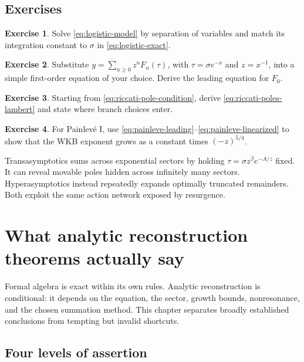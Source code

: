 \documentclass[11pt,openany]{book}
\theoremstyle{definition}
\newtheorem{exercise}{Exercise}[chapter]
\theoremstyle{plain}
\theoremstyle{remark}
\begin{document}
\section{Exercises}

\begin{exercise}
Solve \eqref{eq:logistic-model} by separation of variables and match its integration constant to $\sigma$ in \eqref{eq:logistic-exact}.
\end{exercise}

\begin{exercise}
Substitute $y=\sum_{n\ge0}z^nF_n(\tau)$, with $\tau=\sigma e^{-x}$ and $z=x^{-1}$, into a simple first-order equation of your choice. Derive the leading equation for $F_0$.
\end{exercise}

\begin{exercise}
Starting from \eqref{eq:riccati-pole-condition}, derive \eqref{eq:riccati-poles-lambert} and state where branch choices enter.
\end{exercise}

\begin{exercise}
For Painlev\'e I, use \eqref{eq:painleve-leading}--\eqref{eq:painleve-linearized} to show that the WKB exponent grows as a constant times $(-z)^{5/4}$.
\end{exercise}

\begin{summarybox}
Transasymptotics sums across exponential sectors by holding $\tau=\sigma z^\beta e^{-A/z}$ fixed. It can reveal movable poles hidden across infinitely many sectors. Hyperasymptotics instead repeatedly expands optimally truncated remainders. Both exploit the same action network exposed by resurgence.
\end{summarybox}


\chapter{What analytic reconstruction theorems actually say}\label{ch:analytic-status}

Formal algebra is exact within its own rules. Analytic reconstruction is conditional: it depends on the equation, the sector, growth bounds, nonresonance, and the chosen summation method. This chapter separates broadly established conclusions from tempting but invalid shortcuts.

\section{Four levels of assertion}
\end{document}
